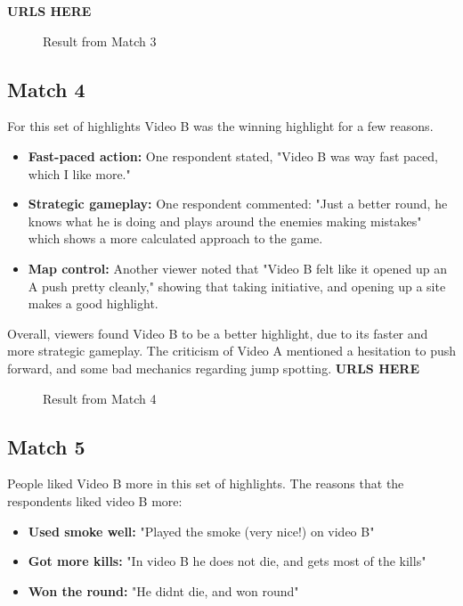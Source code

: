 \textbf{URLS HERE}
\begin{figure}
\centering
{}
\caption{Result from Match 3}
\label{fig:match3}
\end{figure}
\subsection{Match 4}


For this set of highlights Video B was the winning highlight for a few reasons.

\begin{itemize}
\item \textbf{Fast-paced action:} One respondent stated, "Video B was way fast paced, which I like more."
\item \textbf{Strategic gameplay:} One respondent commented: "Just a better round, he knows what he is doing and plays around the enemies making mistakes" which shows a more calculated approach to the game.
\item \textbf{Map control:} Another viewer noted that "Video B felt like it opened up an A push pretty cleanly," showing that taking initiative, and opening up a site makes a good highlight.
\end{itemize}

Overall, viewers found Video B to be a better highlight, due to its faster and more strategic gameplay. The criticism of Video A mentioned a hesitation to push forward, and some bad mechanics regarding jump spotting.
\textbf{URLS HERE}
\begin{figure}
\centering
{}
\caption{Result from Match 4}
\label{fig:match4}
\end{figure}
\subsection{Match 5}


People liked Video B more in this set of highlights.
The reasons that the respondents liked video B more:

\begin{itemize}
\item \textbf{Used smoke well:} "Played the smoke (very nice!) on video B"
\item \textbf{Got more kills:} "In video B he does not die, and gets most of the kills"
\item \textbf{Won the round:} "He didnt die, and won round"
\end{itemize}


